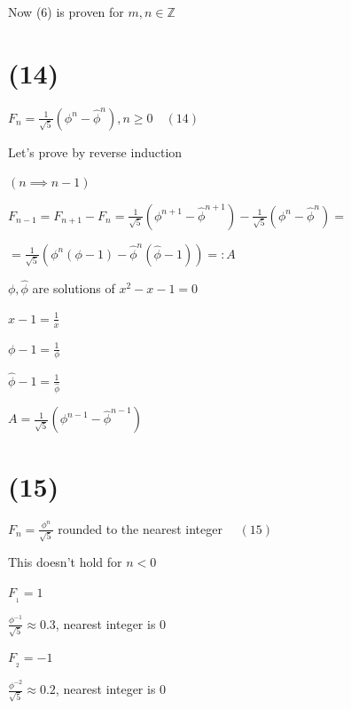 \documentclass{article}
\begin{document}
Now (6) is proven for $m,n \in \mathbb{Z}$

\section*{(14)}

$F_{n} = \frac{1}{\sqrt{5}}(\phi^n - \widehat{\phi}^n), n \geq 0 \quad (14)$

Let's prove by reverse induction

$(n \implies n - 1)$

$F_{n-1} = F_{n+1} - F_n = \frac{1}{\sqrt{5}}(\phi^{n+1} - \widehat{\phi}^{n+1}) - \frac{1}{\sqrt{5}}(\phi^n - \widehat{\phi}^n) =$

$= \frac{1}{\sqrt{5}}(\phi^n(\phi -1) - \widehat{\phi}^n(\widehat{\phi} - 1)) =: A$

$\phi, \widehat{\phi}$ are solutions of $x^2-x-1 = 0$

$x - 1 = \frac{1}{x}$

$\phi - 1 = \frac{1}{\phi}$

$\widehat{\phi} - 1 = \frac{1}{\widehat{\phi}}$

$A = \frac{1}{\sqrt{5}}(\phi^{n-1} - \widehat{\phi}^{n-1})$

\section*{(15)}

$F_n = \frac{\phi^n}{\sqrt{5}}$ rounded to the nearest integer $\quad (15)$

This doesn't hold for $n < 0$

$F_{_1} = 1$

$\frac{\phi^{-1}}{\sqrt{5}} \approx 0.3$, nearest integer is $0$

$F_{_2} = -1$

$\frac{\phi^{-2}}{\sqrt{5}} \approx 0.2$, nearest integer is $0$
\end{document}

